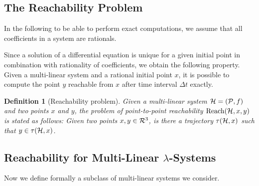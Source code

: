 \documentclass[copyright,creativecommons]{packages/eptcs}
\newcommand{\traj}{\tau}
\newcommand{\reach}{{\mbox{Reach}}}
\newtheorem{definition}[theorem]{Definition}
\begin{document}
 
\subsection{The Reachability Problem}

In the following to be able to perform exact computations, we assume that all coefficients in a system are rationals.

Since a  solution of a differential equation is unique for a given initial point in combination with rationality of coefficients, we obtain the following property. Given a multi-linear system and a rational  initial  point $x$, it is possible to compute  the point $y$ 
reachable  from $x$ after time interval $\Delta t$ exactly.  

\begin{definition}[Reachability problem]
 Given a multi-linear system ${\cal{H}}=({\cal P},f)$ and two points $x$ and $y$, the problem of point-to-point reachability  $\reach({\cal{H}},x,y)$ is stated as follows: Given two points $x,y\in {\cal R}^3$, is there a trajectory $\traj({\cal{H}},x)$ such that   $y\in\traj({\cal{H}},x)$.
\end{definition}



\subsection{Reachability for Multi-Linear $\lambda$-Systems}

Now we define formally a subclass of multi-linear systems we consider. 
\end{document}
